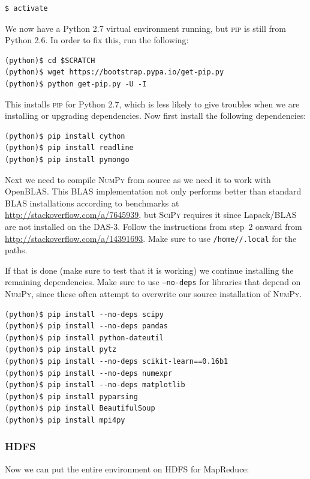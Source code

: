\documentclass{article}
\begin{document}
\begin{verbatim}
$ activate
\end{verbatim}

We now have a Python 2.7 virtual environment running, but \textsc{pip} is still 
from Python 2.6. In order to fix this, run the following:

\begin{verbatim}
(python)$ cd $SCRATCH
(python)$ wget https://bootstrap.pypa.io/get-pip.py
(python)$ python get-pip.py -U -I
\end{verbatim}

This installs \textsc{pip} for Python 2.7, which is less likely to give 
troubles when we are installing or upgrading dependencies. Now first install the following dependencies:

\begin{verbatim}
(python)$ pip install cython
(python)$ pip install readline
(python)$ pip install pymongo
\end{verbatim}

Next we need to compile \textsc{NumPy} from source as we need it to work with 
OpenBLAS\@. This BLAS implementation not only performs better than standard
BLAS installations according to benchmarks at 
\url{http://stackoverflow.com/a/7645939}, but \textsc{SciPy} requires it 
since Lapack/BLAS are not installed on the DAS-3. Follow the instructions 
from step~2 onward from \url{http://stackoverflow.com/a/14391693}. Make sure to 
use \texttt{/home//.local} for the paths.

If that is done (make sure to test that it is working) we continue installing 
the remaining dependencies. Make sure to use \texttt{--no-deps} for libraries 
that depend on \textsc{NumPy}, since these often attempt to overwrite our 
source installation of \textsc{NumPy}.

\begin{verbatim}
(python)$ pip install --no-deps scipy
(python)$ pip install --no-deps pandas
(python)$ pip install python-dateutil
(python)$ pip install pytz
(python)$ pip install --no-deps scikit-learn==0.16b1
(python)$ pip install --no-deps numexpr
(python)$ pip install --no-deps matplotlib
(python)$ pip install pyparsing
(python)$ pip install BeautifulSoup
(python)$ pip install mpi4py
\end{verbatim}

\subsubsection{HDFS}\label{app:hdfs}
Now we can put the entire environment on HDFS for MapReduce:
\end{document}
